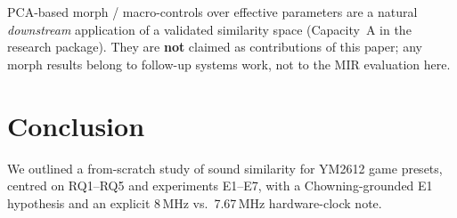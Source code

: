 \documentclass{article}
\begin{document}
PCA-based morph / macro-controls over effective parameters are a natural
\emph{downstream} application of a validated similarity space (Capacity~A in
the research package).
They are \textbf{not} claimed as contributions of this paper; any morph
results belong to follow-up systems work, not to the MIR evaluation here.

\section{Conclusion}
\label{sec:conclusion}

We outlined a from-scratch study of sound similarity for YM2612 game presets,
centred on RQ1--RQ5 and experiments E1--E7, with a Chowning-grounded E1
hypothesis and an explicit 8\,MHz vs.\ 7.67\,MHz hardware-clock note.


\end{document}
